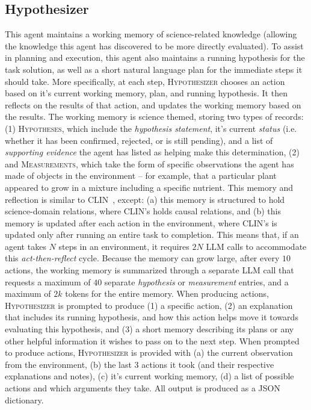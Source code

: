 \subsection{Hypothesizer}
\label{sec:appendix-hypothesizer}
This agent maintains a working memory of science-related knowledge (allowing the knowledge this agent has discovered to be more directly evaluated).  To assist in planning and execution, this agent also maintains a running hypothesis for the task solution, as well as a short natural language plan for the immediate steps it should take.  More specifically, at each step, \textsc{Hypothesizer} chooses an action based on it's current working memory, plan, and running hypothesis.  It then reflects on the results of that action, and updates the working memory based on the results.  The working memory is science themed, storing two types of records: (1) \textsc{Hypotheses}, which include the \textit{hypothesis statement}, it's current \textit{status} (i.e. whether it has been confirmed, rejected, or is still pending), and a list of \textit{supporting evidence} the agent has listed as helping make this determination, (2) and \textsc{Measurements}, which take the form of specific observations the agent has made of objects in the environment -- for example, that a particular plant appeared to grow in a mixture including a specific nutrient.  This memory and reflection is similar to \textsc{CLIN}~\cite{Majumder2023CLINAC}, except: (a) this memory is structured to hold science-domain relations, where \textsc{CLIN}'s holds causal relations, and (b) this memory is updated after each action in the environment, where \textsc{CLIN}'s is updated only after running an entire task to completion.  This means that, if an agent takes $N$ steps in an environment, it requires $2N$ LLM calls to accommodate this \textit{act-then-reflect} cycle.  Because the memory can grow large, after every $10$ actions, the working memory is summarized through a separate LLM call that requests a maximum of $40$ separate \textit{hypothesis} or \textit{measurement} entries, and a maximum of $2k$ tokens for the entire memory.  When producing actions, \textsc{Hypothesizer} is prompted to produce (1) a specific action, (2) an explanation that includes its running hypothesis, and how this action helps move it towards evaluating this hypothesis, and (3) a short memory describing its plans or any other helpful information it wishes to pass on to the next step.  When prompted to produce actions, \textsc{Hypothesizer} is provided with (a) the current observation from the environment, (b) the last 3 actions it took (and their respective explanations and notes), (c) it's current working memory, (d) a list of possible actions and which arguments they take.  All output is produced as a \textsc{JSON} dictionary. 

